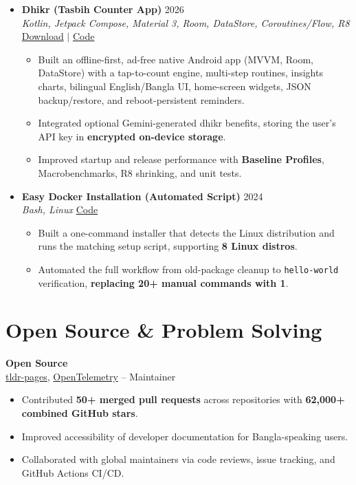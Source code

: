\documentclass[a4paper,11pt]{article}
\newcommand{\resumeItem}[1]{
  \item\small{
    {#1 \vspace{-2pt}}
  }
}
\newcommand{\resumeItemListStart}{\begin{itemize}}
\newcommand{\resumeItemListEnd}{\end{itemize}\vspace{-5pt}}
\newcommand{\subheading}[1]{\noindent \textbf{#1} \\}
\begin{document}
\begin{itemize}[leftmargin=0.15in, label={}, itemsep=6pt]
    \item
    \textbf{Dhikr (Tasbih Counter App)} \hfill 2026\\
    \small\textit{Kotlin, Jetpack Compose, Material 3, Room, DataStore, Coroutines/Flow, R8} \hfill
    \href{https://github.com/badhon495/Dhikr/releases}{Download} $|$
    \href{https://github.com/badhon495/Dhikr}{Code}
    \vspace{-5pt}
    \resumeItemListStart
      \resumeItem{Built an offline-first, ad-free native Android app (MVVM, Room, DataStore) with a tap-to-count engine, multi-step routines, insights charts, bilingual English/Bangla UI, home-screen widgets, JSON backup/restore, and reboot-persistent reminders.}
      \resumeItem{Integrated optional Gemini-generated dhikr benefits, storing the user's API key in \textbf{encrypted on-device storage}.}
      \resumeItem{Improved startup and release performance with \textbf{Baseline Profiles}, Macrobenchmarks, R8 shrinking, and unit tests.}
    \resumeItemListEnd

    \item
    \textbf{Easy Docker Installation (Automated Script)} \hfill 2024\\
    \small\textit{Bash, Linux} \hfill
    \href{https://github.com/badhon495/Easy_Docker_Installation}{Code}
    \vspace{-5pt}
    \resumeItemListStart
      \resumeItem{Built a one-command installer that detects the Linux distribution and runs the matching setup script, supporting \textbf{8 Linux distros}.}
      \resumeItem{Automated the full workflow from old-package cleanup to \texttt{hello-world} verification, \textbf{replacing 20+ manual commands with 1}.}
    \resumeItemListEnd
    
  \end{itemize}




\section{Open Source \& Problem Solving}

\small
\subheading{Open Source}
\href{https://github.com/tldr-pages/tldr}{tldr-pages}, \href{https://github.com/open-telemetry}{OpenTelemetry} --
Maintainer
\begin{itemize}[noitemsep, topsep=0pt]
    \item Contributed \textbf{50+ merged pull requests} across repositories with \textbf{62,000+ combined GitHub stars}.
    \item Improved accessibility of developer documentation for Bangla-speaking users.
    \item Collaborated with global maintainers via code reviews, issue tracking, and GitHub Actions CI/CD.
\end{itemize}
\end{document}
